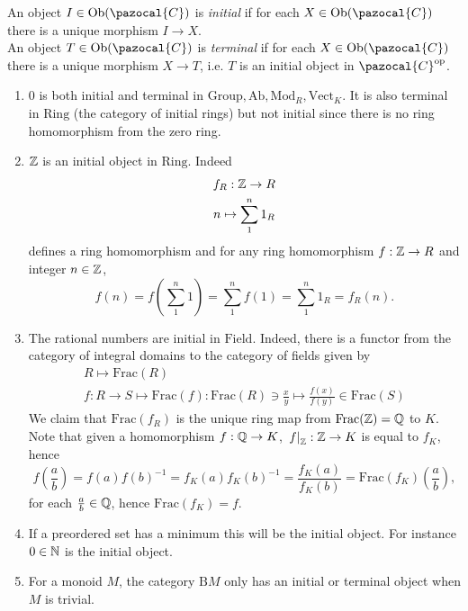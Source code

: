     \begin{definition}
        An object $I\in \Ob(\pazocal{C})$ is \emph{initial} if for each $X\in \Ob(\pazocal{C})$ there is a unique morphism $I\rightarrow X$.\\
        An object $T\in \Ob(\pazocal{C})$ is \emph{terminal} if for each $X\in\Ob(\pazocal{C})$ there is a unique morphism $X\rightarrow T$, i.e. $T$ is an initial object in $\pazocal{C}\op$.
    \end{definition}
    \begin{example}
        \begin{enumerate}
            \item $0$ is both initial and terminal in $\mathrm{Group},\mathrm{Ab},\mathrm{Mod}_R,\mathrm{Vect}_K$. It is also terminal in $\mathrm{Ring}$ (the category of initial rings) but not initial since there is no ring homomorphism from the zero ring. 
            \item $\mathbb{Z}$ is an initial object in $\mathrm{Ring}$. Indeed 
            \begin{gather*}
                f_R : \mathbb{Z} \rightarrow R\\
                n \mapsto \sum_1^n 1_R
            \end{gather*}
            defines a ring homomorphism and for any ring homomorphism $f : \mathbb{Z} \rightarrow R$ and integer $n\in\mathbb{Z}$, 
            $$
                f(n)= f\left(\sum_1^n 1 \right) = \sum_1^n f(1)= \sum_1^n 1_R=f_R(n).
            $$
            \item The rational numbers are initial in $\mathrm{Field}$. Indeed, there is a functor from the category of integral domains to the category of fields given by 
            \begin{gather*}
                R\mapsto \mathrm{Frac}(R)\\
                f : R\rightarrow S \mapsto \mathrm{Frac}(f):\mathrm{Frac}(R)\ni\frac{x}{y}\mapsto \frac{f(x)}{f(y)} \in \mathrm{Frac}(S) 
            \end{gather*}
            We claim that $\mathrm{Frac}(f_R)$ is the unique ring map from $\mathrm{Frac}(\mathbb{Z}) = \mathbb{Q}$ to $K$. Note that given a homomorphism $f: \mathbb{Q}\rightarrow K$, $\left. f \right|_{\mathbb{Z}} : \mathbb{Z} \rightarrow K$ is equal to $f_K$, hence 
            $$f(\frac{a}{b})= f(a)f(b)^{-1}=f_K(a)f_K(b)^{-1}=\frac{f_K(a)}{f_K(b)}=\mathrm{Frac}(f_K)(\frac{a}{b}),$$
            for each $\frac{a}{b}\in \mathbb{Q}$, hence $\mathrm{Frac}(f_K)=f$.
            \item If a preordered set has a minimum this will be the initial object. For instance $0\in \mathbb{N}$ is the initial object.
            \item For a monoid $M$, the category $\mathrm{B}M$ only has an initial or terminal object when $M$ is trivial. 
        \end{enumerate}
    \end{example}
